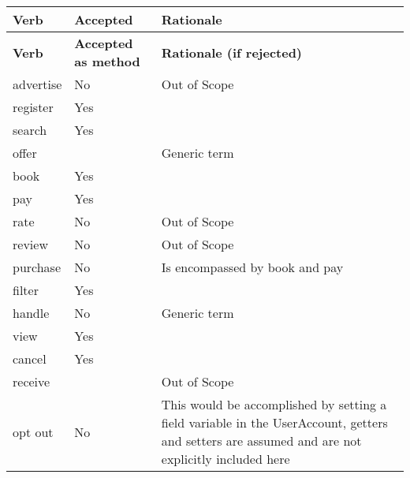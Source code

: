 \renewcommand*{\arraystretch}{1.3}
\begin{longtable}{m{2.5cm} >{\centering\arraybackslash}m{2cm} m{6cm}}
	\toprule
	\textbf{Verb} & \textbf{Accepted} & \textbf{Rationale} \\
	\midrule
	\endhead
	\toprule
	\textbf{Verb} & \textbf{Accepted as method} & \textbf{Rationale (if rejected)} \\
	\endfirsthead
	\midrule
	advertise & No & Out of Scope \\
	\midrule
	register & Yes &  \\
	\midrule
	search & Yes &  \\
	\midrule
	offer &  & Generic term \\
	\midrule
	book & Yes &  \\
	\midrule
	pay & Yes &  \\
	\midrule
	rate & No & Out of Scope \\
	\midrule
	review & No & Out of Scope \\
	\midrule
	purchase & No & Is encompassed by book and pay \\
	\midrule
	filter & Yes &  \\
	\midrule
	handle & No & Generic term \\
	\midrule
	view & Yes &  \\
	\midrule
	cancel & Yes &  \\
	\midrule
	receive &  & Out of Scope \\
	\midrule
	opt out & No & This would be accomplished by setting a field variable in
	the UserAccount, getters and setters are assumed and are not explicitly
	included here \\
	\bottomrule
\end{longtable}
